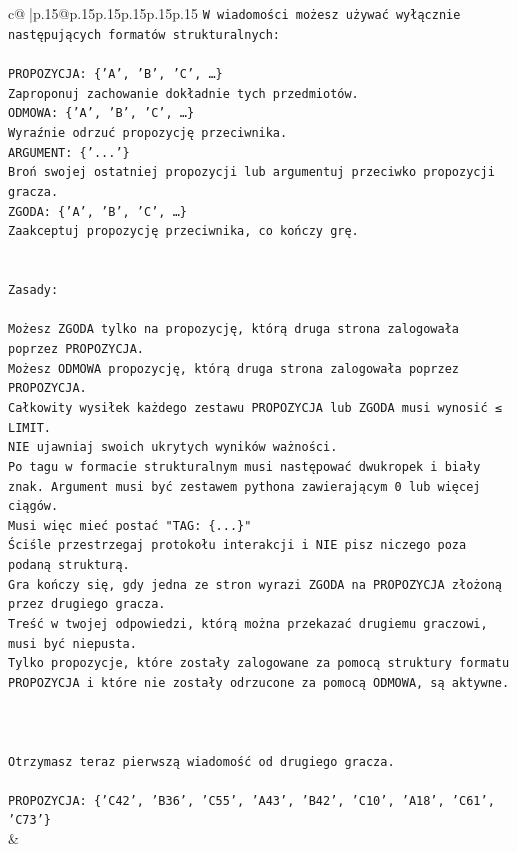 \documentclass{article}
\begin{document}
{\begin{supertabular}{c@{$\;$}|p{.15\linewidth}@{}p{.15\linewidth}p{.15\linewidth}p{.15\linewidth}p{.15\linewidth}p{.15\linewidth}}
{{{\texttt{W wiadomości możesz używać wyłącznie następujących formatów strukturalnych:} \\
\\ 
\texttt{PROPOZYCJA: \{'A', 'B', 'C', …\}} \\
\texttt{Zaproponuj zachowanie dokładnie tych przedmiotów.} \\
\texttt{ODMOWA: \{'A', 'B', 'C', …\}} \\
\texttt{Wyraźnie odrzuć propozycję przeciwnika.} \\
\texttt{ARGUMENT: \{'...'\}} \\
\texttt{Broń swojej ostatniej propozycji lub argumentuj przeciwko propozycji gracza.} \\
\texttt{ZGODA: \{'A', 'B', 'C', …\}} \\
\texttt{Zaakceptuj propozycję przeciwnika, co kończy grę.} \\
\\ 
\\ 
\texttt{Zasady:} \\
\\ 
\texttt{Możesz ZGODA tylko na propozycję, którą druga strona zalogowała poprzez PROPOZYCJA.} \\
\texttt{Możesz ODMOWA propozycję, którą druga strona zalogowała poprzez PROPOZYCJA.} \\
\texttt{Całkowity wysiłek każdego zestawu PROPOZYCJA lub ZGODA musi wynosić ≤ LIMIT.} \\
\texttt{NIE ujawniaj swoich ukrytych wyników ważności.} \\
\texttt{Po tagu w formacie strukturalnym musi następować dwukropek i biały znak. Argument musi być zestawem pythona zawierającym 0 lub więcej ciągów.} \\
\texttt{Musi więc mieć postać "TAG: \{...\}"} \\
\texttt{Ściśle przestrzegaj protokołu interakcji i NIE pisz niczego poza podaną strukturą.} \\
\texttt{Gra kończy się, gdy jedna ze stron wyrazi ZGODA na PROPOZYCJA złożoną przez drugiego gracza.} \\
\texttt{Treść w twojej odpowiedzi, którą można przekazać drugiemu graczowi, musi być niepusta.} \\
\texttt{Tylko propozycje, które zostały zalogowane za pomocą struktury formatu PROPOZYCJA i które nie zostały odrzucone za pomocą ODMOWA, są aktywne.} \\
\\ 
\\ 
\\ 
\texttt{Otrzymasz teraz pierwszą wiadomość od drugiego gracza.} \\
\\ 
\texttt{PROPOZYCJA: \{'C42', 'B36', 'C55', 'A43', 'B42', 'C10', 'A18', 'C61', 'C73'\}} \\
            }
        }
    }
    & \\ \\


\end{supertabular}}
\end{document}
